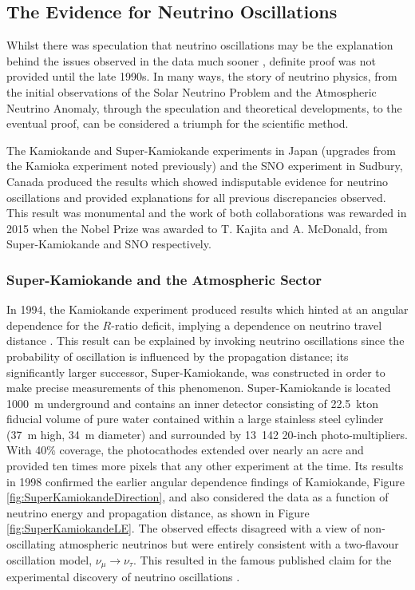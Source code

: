 \subsection{The Evidence for Neutrino Oscillations}\label{sec:EvidenceNeutrinoOscillations}

Whilst there was speculation that neutrino oscillations may be the explanation behind the issues observed in the data much sooner \cite{Casper1991,BeckerSzendy1992}, definite proof was not provided until the late 1990s.  In many ways, the story of neutrino physics, from the initial observations of the Solar Neutrino Problem and the Atmospheric Neutrino Anomaly, through the speculation and theoretical developments, to the eventual proof, can be considered a triumph for the scientific method.

The Kamiokande and Super-Kamiokande experiments in Japan (upgrades from the Kamioka experiment noted previously) and the SNO experiment in Sudbury, Canada produced the results which showed indisputable evidence for neutrino oscillations and provided explanations for all previous discrepancies observed.  This result was monumental and the work of both collaborations was rewarded in 2015 when the Nobel Prize was awarded to T. Kajita and A. McDonald, from Super-Kamiokande and SNO respectively.

\subsubsection{Super-Kamiokande and the Atmospheric Sector}\label{sec:SuperKamiokande}

In 1994, the Kamiokande experiment produced results which hinted at an angular dependence for the $R$-ratio deficit, implying a dependence on neutrino travel distance \cite{Kamiokande1994}.  This result can be explained by invoking neutrino oscillations since the probability of oscillation is influenced by the propagation distance; its significantly larger successor, Super-Kamiokande, was constructed in order to make precise measurements of this phenomenon.  Super-Kamiokande is located 1000~m underground and contains an inner detector consisting of 22.5~kton fiducial volume of pure water contained within a large stainless steel cylinder (37~m high, 34~m diameter) and surrounded by 13~142 20-inch photo-multipliers.  With 40\% coverage, the photocathodes extended over nearly an acre and provided ten times more pixels that any other experiment at the time.  Its results in 1998 confirmed the earlier angular dependence findings of Kamiokande, Figure \ref{fig:SuperKamiokandeDirection}, and also considered the data as a function of neutrino energy and propagation distance, as shown in Figure \ref{fig:SuperKamiokandeLE}.  The observed effects disagreed with a view of non-oscillating atmospheric neutrinos but were entirely consistent with a two-flavour oscillation model, $\nu_{\mu} \rightarrow \nu_{\tau}$.  This resulted in the famous published claim for the experimental discovery of neutrino oscillations \cite{SuperKamiokande1998}.

